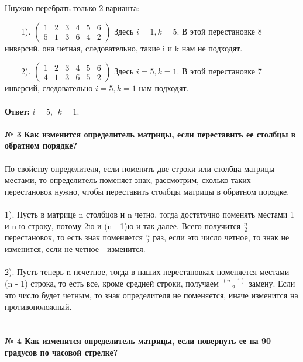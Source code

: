 \documentclass[a4paper, 12pt]{article}
\begin{document}
    \\
    \\ Ннужно перебрать только 2 варианта:
    \\
    \par \ \ \ \ 1). $\begin{pmatrix}1 & 2 & 3 & 4 & 5 & 6 \\ 5 & 1 & 3 & 6 & 4 & 2 \end{pmatrix}$ Здесь $i = 1, k = 5$. В этой перестановке 8 инверсий, она четная, следовательно, такие i и k нам не подходят.
    \\
    \par \ \ \ \ 2). $\begin{pmatrix}1 & 2 & 3 & 4 & 5 & 6 \\ 4 & 1 & 3 & 6 & 5 & 2 \end{pmatrix}$ Здесь $i = 5, k = 1$. В этой перестановке 7 инверсий, следовательно $i = 5, k = 1$ нам подходят.
    \\
    \\ \textbf{Ответ: } $i = 5, \ \  k = 1$.
    \\
    \\ \textbf{№ 3} \textbf{Как изменится определитель матрицы, если переставить ее столбцы в обратном порядке?}
    \\
    \\ По свойству определителя, если поменять две строки или столбца матрицы местами, то определитель поменяет знак, рассмотрим, сколько таких перестановок нужно, чтобы переставить столбцы матрицы в обратном порядке.
    \\
    \\ 1). Пусть в матрице n столбцов и n четно, тогда достаточно поменять местами 1 и n-ю строку, потому 2ю и (n - 1)ю и так далее. Всего получится $\frac{n}{2}$ перестановок, то есть знак поменяется $\frac{n}{2}$ раз, если это число четное, то знак не изменится, если не четное - изменится.
    \\
    \\ 2). Пусть теперь n нечетное, тогда в наших перестановках поменяется местами (n - 1) строка, то есть все, кроме средней строки, получаем $\frac{(n - 1)}{2}$ замену. Если это число будет четным, то знак определителя не поменяется, иначе изменится на противоположный.
    \\
    \\
    \\ \textbf{№ 4 Как изменится определитель матрицы, если повернуть ее на 90 градусов по часовой стрелке?}
    \\
\end{document}
